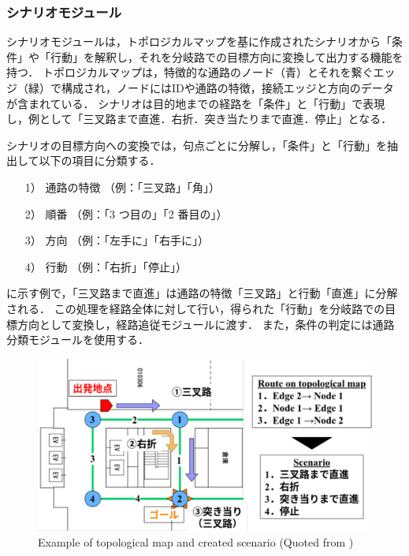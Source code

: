 \subsubsection{シナリオモジュール}
シナリオモジュールは，トポロジカルマップを基に作成されたシナリオから「条件」や「行動」を解釈し，それを分岐路での目標方向に変換して出力する機能を持つ．
トポロジカルマップは，特徴的な通路のノード（青）とそれを繋ぐエッジ（緑）で構成され，ノードにはIDや通路の特徴，接続エッジと方向のデータが含まれている．
シナリオは目的地までの経路を「条件」と「行動」で表現し，例として「三叉路まで直進．右折．突き当たりまで直進．停止」となる．

シナリオの目標方向への変換では，句点ごとに分解し，「条件」と「行動」を抽出して以下の項目に分類する．
\begin{enumerate}
  \item [1）] 通路の特徴 （例：「三叉路」「角」）
  \item [2）] 順番 （例：「3 つ目の」「2 番目の」） 
  \item [3）] 方向 （例：「左手に」「右手に」）
  \item [4）] 行動 （例：「右折」「停止」）
\end{enumerate}

に示す例で，「三叉路まで直進」は通路の特徴「三叉路」と行動「直進」に分解される．
この処理を経路全体に対して行い，得られた「行動」を分岐路での目標方向として変換し，経路追従モジュールに渡す．
また，条件の判定には通路分類モジュールを使用する．

\begin{figure}[htbp]
  \centering
   \includegraphics[width=130mm]{images/pdf/haruyama/scenario.pdf}
   \caption[Example of topological map and created scenario]{Example of topological map and created scenario (Quoted from \cite{haruyama2023})}
   \label{fig:scenario}
\end{figure}

